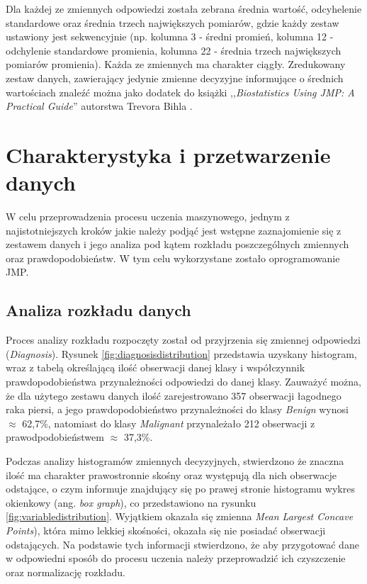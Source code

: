 	Dla każdej ze zmiennych odpowiedzi została zebrana średnia wartość, odcyhelenie standardowe oraz średnia trzech największych pomiarów, gdzie każdy zestaw ustawiony jest sekwencyjnie (np. kolumna 3 - średni promień, kolumna 12 - odchylenie standardowe promienia, kolumna 22 - średnia trzech największych pomiarów promienia). Każda ze zmiennych ma charakter ciągły. Zredukowany zestaw danych, zawierający jedynie zmienne decyzyjne informujące o średnich wartościach znaleźć można jako dodatek do książki ,,\textit{Biostatistics Using JMP: A Practical Guide}'' autorstwa Trevora Bihla \cite{biostatisticsJMP}.
	
\section{Charakterystyka i przetwarzenie danych}

	W celu przeprowadzenia procesu uczenia maszynowego, jednym z najistotniejszych kroków jakie należy podjąć jest wstępne zaznajomienie się z zestawem danych i jego analiza pod kątem rozkładu poszczególnych zmiennych oraz prawdopodobieństw. W tym celu wykorzystane zostało oprogramowanie JMP. 

	\subsection{Analiza rozkładu danych}
		
	Proces analizy rozkładu rozpoczęty został od przyjrzenia się zmiennej odpowiedzi (\textit{Diagnosis}). Rysunek \ref{fig:diagnosisdistribution} przedstawia uzyskany histogram, wraz z tabelą określającą ilość obserwacji danej klasy i współczynnik prawdopodobieństwa przynależności odpowiedzi do danej klasy. Zauważyć można, że dla użytego zestawu danych ilość zarejestrowano 357 obserwacji łagodnego raka piersi, a jego prawdopodobieństwo przynależności do klasy \textit{Benign} wynosi $\approx$ 62,7\%, natomiast do klasy \textit{Malignant} przynależało 212 obserwacji z prawodpodobieństwem $\approx$ 37,3\%.
		
	Podczas analizy histogramów zmiennych decyzyjnych, stwierdzono że znaczna ilość ma charakter prawostronnie skośny oraz występują dla nich obserwacje odstające, o czym informuje znajdujący się po prawej stronie histogramu wykres okienkowy (ang. \textit{box graph}), co przedstawiono na rysunku \ref{fig:variabledistribution}. Wyjątkiem okazała się zmienna \textit{Mean Largest Concave Points}), która mimo lekkiej skośności, okazała się nie posiadać obserwacji odstających. Na podstawie tych informacji stwierdzono, że aby przygotować dane w odpowiedni sposób do procesu uczenia należy przeprowadzić ich czyszczenie oraz normalizację rozkładu.
	
